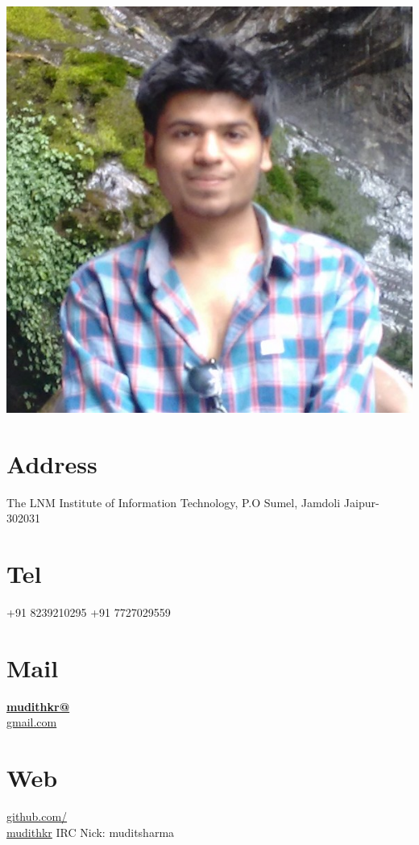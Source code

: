 \documentclass[]{friggeri-cv}
\begin{document}

      

\begin{aside}
  \includegraphics[scale=0.18]{img/dp.jpg}
  \section{Address}
    The LNM Institute of Information Technology,
    P.O Sumel, Jamdoli
    Jaipur-302031
    ~
  \section{Tel}
    +91 8239210295
    +91 7727029559
    ~
  \section{Mail}
    \href{mailto: mudithkr@gmail.com}{\textbf{mudithkr@}\\gmail.com}
    ~
  \section{Web}
    \href{https://github.com/mygit}{github.com/\\mudithkr}
        {IRC Nick: muditsharma} 
   ~

\end{aside}
\end{document}
